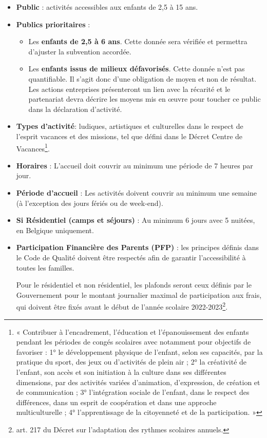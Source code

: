 \begin{itemize}
\item \textbf{Public} : activités accessibles aux enfants de 2,5 à 15 ans.
\item \textbf{Publics prioritaires} :
\begin{itemize}
    \item Les \textbf{enfants de 2,5 à 6 ans}. Cette donnée sera vérifiée et permettra d’ajuster la subvention accordée.
    \item Les \textbf{enfants issus de milieux défavorisés}. Cette donnée n’est pas quantifiable. Il s’agit donc d’une obligation de moyen et non de résultat. Les actions entreprises présenteront un lien avec la récarité et le partenariat devra décrire les moyens mis en œuvre pour toucher ce public dans la déclaration d’activité.
\end{itemize}
\item \textbf{Types d’activité}: ludiques, artistiques et culturelles dans le respect de l’esprit vacances et des missions, tel que défini dans le Décret Centre de Vacances\footnote{« Contribuer à l'encadrement, l'éducation et l'épanouissement des enfants pendant les périodes de congés scolaires avec notamment pour objectifs de favoriser : 1° le développement physique de l'enfant, selon ses capacités, par la pratique du sport, des jeux ou d'activités de plein air ; 2° la créativité de l'enfant, son accès et son initiation à la culture dans ses différentes dimensions, par des activités variées d'animation, d'expression, de création et de communication ; 3° l'intégration sociale de l'enfant, dans le respect des différences, dans un esprit de coopération et dans une approche multiculturelle ; 4° l'apprentissage de la citoyenneté et de la participation. »}.
\item \textbf{Horaires} : L’accueil doit couvrir au minimum une période de 7 heures par jour.
\item \textbf{Période d’accueil} : Les activités doivent couvrir au minimum une semaine (à l’exception des jours fériés ou de week-end).
\item \textbf{Si Résidentiel (camps et séjours)} : Au minimum 6 jours avec 5 nuitées, en Belgique uniquement.
\item \textbf{Participation Financière des Parents (PFP)} : les principes définis dans le Code de Qualité doivent être respectés afin de garantir l’accessibilité à toutes les familles.

Pour le résidentiel et non résidentiel, les plafonds seront ceux définis par le Gouvernement pour le montant journalier maximal de participation aux frais, qui doivent être fixés avant le début de l’année scolaire 2022-2023\footnote{art. 217 du Décret sur l’adaptation des rythmes scolaires annuels.}.


\end{itemize}
